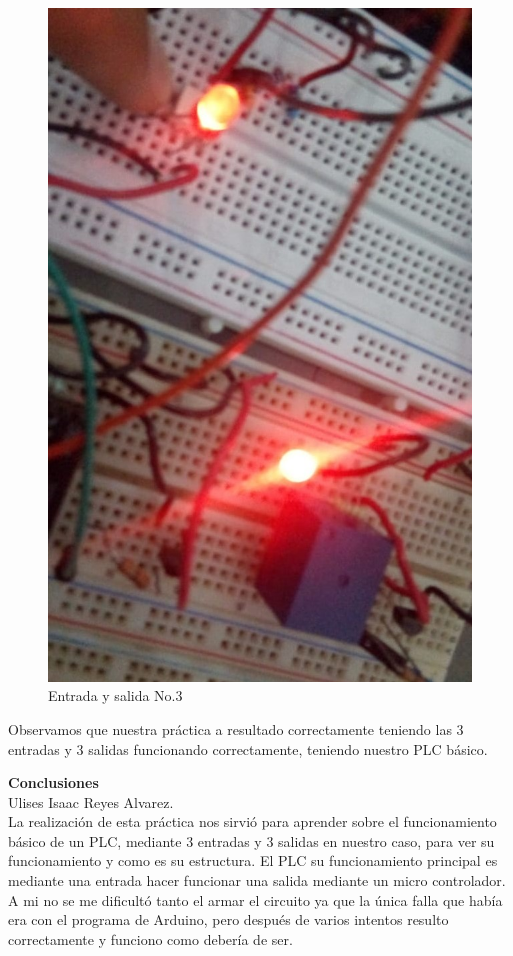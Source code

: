 \documentclass[12pt,a4paper]{article}
\begin{document}
\begin{figure}[hbtp]
\centering
\includegraphics[scale=0.35]{Circuito/3.jpeg}
\caption{Entrada y salida No.3}
\end{figure} 
Observamos que nuestra práctica a resultado correctamente teniendo las 3 entradas y 3 salidas funcionando correctamente, teniendo nuestro PLC básico.

\newpage
\textbf{Conclusiones}\\
Ulises Isaac Reyes Alvarez.\\
La realización de esta práctica nos sirvió para aprender sobre el funcionamiento básico de un PLC, mediante 3 entradas y 3 salidas en nuestro caso, para ver su funcionamiento y como es su estructura. El PLC su funcionamiento principal es mediante una entrada hacer funcionar una salida mediante un micro controlador.\\
A mi no se me dificultó tanto el armar el circuito ya que la única falla que había era con el programa de Arduino, pero después de varios intentos resulto correctamente y funciono como debería de ser. \\
\end{document}
